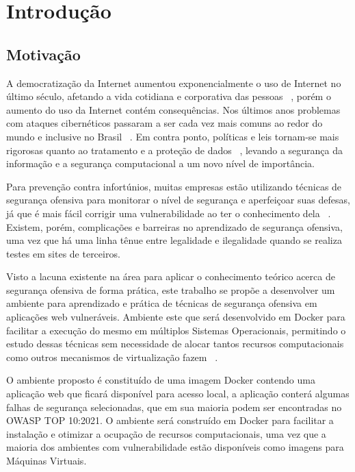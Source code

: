 \chapter{Introdução}

\label{sec.intro}

\section{Motivação}

A democratização da Internet aumentou exponencialmente o uso de Internet no último século, afetando a vida cotidiana e corporativa das pessoas ~\cite{carneiro2022}, porém o aumento do uso da Internet contém consequências. Nos últimos anos problemas com ataques cibernéticos passaram a ser cada vez mais comuns ao redor do mundo e inclusive no Brasil  ~\cite{avila2013brasil}. Em contra ponto, políticas e leis tornam-se mais rigorosas quanto ao tratamento e a proteção de dados ~\cite{Neves_Lopes_Pavani_Sales_2021}, levando a segurança da informação e a segurança computacional a um novo nível de importância.

Para prevenção contra infortúnios, muitas empresas estão utilizando técnicas de segurança ofensiva para monitorar o nível de segurança e aperfeiçoar suas defesas, já que é mais fácil corrigir uma vulnerabilidade ao ter o conhecimento dela ~\cite{vieira2018}. Existem, porém, complicações e barreiras no aprendizado de segurança ofensiva, uma vez que há uma linha tênue entre legalidade e ilegalidade quando se realiza testes em sites de terceiros.

Visto a lacuna existente na área para aplicar o conhecimento teórico acerca de segurança ofensiva de forma prática, este trabalho se propõe a desenvolver um ambiente para aprendizado e prática de técnicas de segurança ofensiva em aplicações web vulneráveis. Ambiente este que será desenvolvido em Docker para facilitar a execução do mesmo em múltiplos Sistemas Operacionais, permitindo o estudo dessas técnicas sem necessidade de alocar tantos recursos computacionais como outros mecanismos de virtualização fazem ~\cite{8528247}.

O ambiente proposto é constituído de uma imagem Docker contendo uma aplicação web que ficará disponível para acesso local, a aplicação conterá algumas falhas de segurança selecionadas, que em sua maioria podem ser encontradas no OWASP TOP 10:2021. O ambiente será construído em Docker para facilitar a instalação e otimizar a ocupação de recursos computacionais, uma vez que a maioria dos ambientes com vulnerabilidade estão disponíveis como imagens para Máquinas Virtuais.

